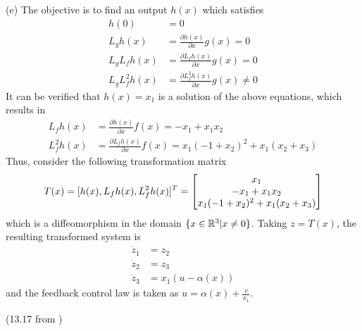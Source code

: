 \documentclass[a4 paper, 12pt]{article}
\begin{document}
(e) The objective is to find an output $h(x)$ which satisfies 
\begin{align}
        h(0) &= 0 \\
        L_gh(x) &= \frac{\partial{h(x)}}{\partial{x}}g(x) = 0 \\
        L_gL_fh(x) &= \frac{\partial{L_fh(x)}}{\partial{x}}g(x) = 0 \\
        L_gL_f^2h(x) &= \frac{\partial{L_f^2h(x)}}{\partial{x}}g(x) \neq 0
\end{align} 
It can be verified that $h(x) = x_1$ is a solution of the above equations, which results in 
\begin{align}
        L_fh(x) &= \frac{\partial{h(x)}}{\partial{x}}f(x) = -x_1+x_1x_2 \\
        L_f^2h(x) &= \frac{\partial{L_fh(x)}}{\partial{x}}f(x) = x_1(-1+x_2)^2 + x_1(x_2+x_3)
\end{align}
Thus, consider the following transformation matrix
\begin{equation}
        T(x) = [h(x), L_fh(x), L_f^2h(x)]^T = \begin{bmatrix} x_1 \\ -x_1+x_1x_2  \\ x_1(-1+x_2)^2 + x_1(x_2+x_3) \end{bmatrix}
\end{equation}
which is a diffeomorphism in the domain $\{ x\in\mathbb{R}^3 | x\neq0 \}$. Taking $z=T(x)$, the resulting transformed system is
\begin{align}
        \dot{z}_1 &= z_2 \\
        \dot{z}_2 &= z_3 \\
        \dot{z}_3 &=  x_1(u-\alpha(x))
\end{align}
and the feedback control law is taken as $u = \alpha(x) + \frac{v}{x_1}$.


 (13.17 from \cite{c1})
\end{document}
